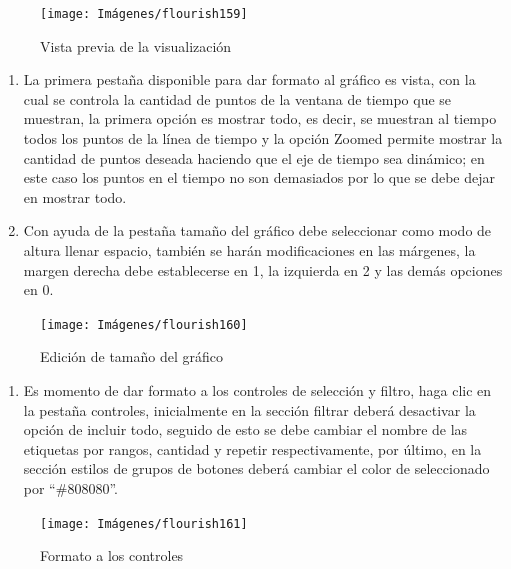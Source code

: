\documentclass[
]{book}
\providecommand{\tightlist}{%
  \setlength{\itemsep}{0pt}\setlength{\parskip}{0pt}}
\begin{document}
\begin{figure}

{\centering \texttt{[image: Imágenes/flourish159]} 

}

\caption{Vista previa de la visualización}\label{fig:paso2carlineasflourish-fig}
\end{figure}

\begin{enumerate}
\def\labelenumi{\arabic{enumi}.}
\setcounter{enumi}{2}
\item
  La primera pestaña disponible para dar formato al gráfico es vista, con la cual se controla la cantidad de puntos de la ventana de tiempo que se muestran, la primera opción es mostrar todo, es decir, se muestran al tiempo todos los puntos de la línea de tiempo y la opción Zoomed permite mostrar la cantidad de puntos deseada haciendo que el eje de tiempo sea dinámico; en este caso los puntos en el tiempo no son demasiados por lo que se debe dejar en mostrar todo.
\item
  Con ayuda de la pestaña tamaño del gráfico debe seleccionar como modo de altura llenar espacio, también se harán modificaciones en las márgenes, la margen derecha debe establecerse en 1, la izquierda en 2 y las demás opciones en 0.
\end{enumerate}

\begin{figure}

{\centering \texttt{[image: Imágenes/flourish160]} 

}

\caption{Edición de tamaño del gráfico}\label{fig:paso4carlineasflourish-fig}
\end{figure}

\begin{enumerate}
\def\labelenumi{\arabic{enumi}.}
\setcounter{enumi}{4}
\tightlist
\item
  Es momento de dar formato a los controles de selección y filtro, haga clic en la pestaña controles, inicialmente en la sección filtrar deberá desactivar la opción de incluir todo, seguido de esto se debe cambiar el nombre de las etiquetas por rangos, cantidad y repetir respectivamente, por último, en la sección estilos de grupos de botones deberá cambiar el color de seleccionado por ``\#808080''.
\end{enumerate}

\begin{figure}

{\centering \texttt{[image: Imágenes/flourish161]} 

}

\caption{Formato a los controles}\label{fig:paso5carlineasflourish-fig}
\end{figure}
\end{document}

